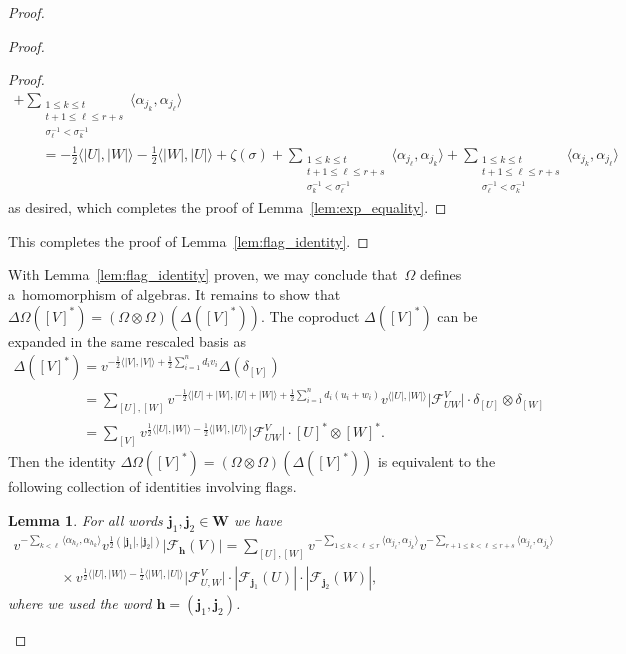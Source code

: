 \documentclass[11pt]{article}
\numberwithin{equation}{section}
\newtheorem{Lemma}[Theorem]{Lemma}
\begin{document}
\begin{proof}
\begin{proof}
\begin{proof}
\begin{gather*}
+\sum\limits_{\substack{1\le k\le t\\t+1\le\ell\le r+s\\ \sigma_\ell^{-1}<\sigma_k^{-1}}}\langle\alpha_{j_k},\alpha_{j_\ell}\rangle
\\
\qquad
=-\frac{1}{2}\langle |U|,|W|\rangle-\frac{1}{2}\langle |W|,|U|\rangle+\zeta(\sigma)
+\sum\limits_{\substack{1\le k\le t\\t+1\le\ell\le r+s\\ \sigma_k^{-1}<\sigma_\ell^{-1}}}\langle\alpha_{j_\ell},\alpha_{j_k}\rangle
+\sum\limits_{\substack{1\le k\le t\\t+1\le\ell\le r+s\\ \sigma_\ell^{-1}<\sigma_k^{-1}}}\langle\alpha_{j_k},\alpha_{j_\ell}\rangle
\end{gather*}
as desired, which completes the proof of Lemma~\ref{lem:exp_equality}.
\end{proof}

This completes the proof of Lemma~\ref{lem:flag_identity}.
\end{proof}

With Lemma~\ref{lem:flag_identity} proven, we may conclude that~$\Omega$ def\/ines a~homomorphism of algebras.
It remains to show that $\Delta\Omega([V]^*)=(\Omega\otimes\Omega)(\Delta([V]^*))$.
The coproduct $\Delta([V]^*)$ can be expanded in the same rescaled basis as
\begin{gather*}
\Delta([V]^*)=v^{-\frac{1}{2}\langle |V|,|V|\rangle+\frac{1}{2}\sum\limits_{i=1}^n d_iv_i}\Delta(\delta_{[V]})
\\
\phantom{\Delta([V]^*)}
 =\sum\limits_{[U],[W]}v^{-\frac{1}{2}\langle |U|+|W|,|U|+|W|\rangle+\frac{1}{2}\sum\limits_{i=1}^n
d_i(u_i+w_i)}v^{\langle|U|,|W|\rangle}\big|\mathcal{F}^V_{UW}\big|\cdot \delta_{[U]}\otimes\delta_{[W]}
\\
\phantom{\Delta([V]^*)}
 =\sum\limits_{[V]}v^{\frac{1}{2}\langle |U|,|W|\rangle-\frac{1}{2}\langle |W|,|U|\rangle} \big|\mathcal{F}^V_{UW}\big|\cdot
[U]^*\otimes[W]^*.
\end{gather*}
Then the identity $\Delta\Omega([V]^*)=(\Omega\otimes\Omega)(\Delta([V]^*))$ is equivalent to the following collection
of identities involving f\/lags.
\begin{Lemma}
For all words $\mathbf{j}_1,\mathbf{j}_2\in\mathbf{W}$ we have
\begin{gather*}
 v^{-\sum\limits_{k<\ell}\langle
\alpha_{h_\ell},\alpha_{h_k}\rangle}v^{\frac{1}{2}(|\mathbf{j}_1|,|\mathbf{j}_2|)}|\mathcal{F}_\mathbf{h}(V)|
 =\sum\limits_{[U],[W]}v^{-\sum\limits_{1\le k<\ell\le r}\langle\alpha_{j_\ell},\alpha_{j_k}\rangle}
v^{-\sum\limits_{r+1\le k<\ell\le r+s}\langle\alpha_{j_\ell},\alpha_{j_k}\rangle}
\\
\qquad
\phantom{=}{}
\times
v^{\frac{1}{2}\langle|U|,|W|\rangle-\frac{1}{2}\langle|W|,|U|\rangle}
\big|\mathcal{F}_{U,W}^V\big|\cdot|\mathcal{F}_{\mathbf{j}_1}(U)|\cdot|\mathcal{F}_{\mathbf{j}_2}(W)|,
\end{gather*}
where we used the word $\mathbf{h}=(\mathbf{j}_1,\mathbf{j}_2)$.
\end{Lemma}


\end{proof}
\end{document}
